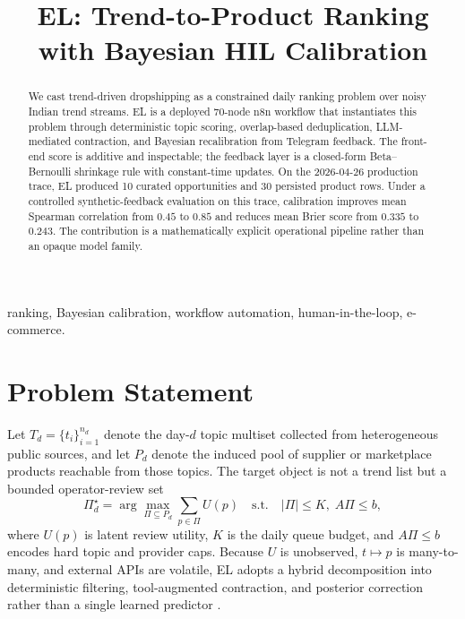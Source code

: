 \documentclass[conference,a4paper,10pt]{IEEEtran}
\title{EL: Trend-to-Product Ranking with Bayesian HIL Calibration}
\author{%
\IEEEauthorblockN{\small Divyesh Sharma, Sankalan Ghosh, Atharva Varshney, Rohan Kumar P, Jivendra Kumar Choudhary, Sourabha Srinivas}
\IEEEauthorblockA{R.V.\ College of Engineering, Bengaluru, India}
}
\begin{document}
\maketitle

\begin{abstract}
We cast trend-driven dropshipping as a constrained daily ranking problem over noisy Indian trend streams. EL is a deployed 70-node n8n workflow that instantiates this problem through deterministic topic scoring, overlap-based deduplication, LLM-mediated contraction, and Bayesian recalibration from Telegram feedback. The front-end score is additive and inspectable; the feedback layer is a closed-form Beta--Bernoulli shrinkage rule with constant-time updates. On the \mbox{2026-04-26} production trace, EL produced 10 curated opportunities and 30 persisted product rows. Under a controlled synthetic-feedback evaluation on this trace, calibration improves mean Spearman correlation from $0.45$ to $0.85$ and reduces mean Brier score from $0.335$ to $0.243$. The contribution is a mathematically explicit operational pipeline rather than an opaque model family.
\end{abstract}

\begin{IEEEkeywords}
ranking, Bayesian calibration, workflow automation, human-in-the-loop, e-commerce.
\end{IEEEkeywords}

\section{Problem Statement}
\label{sec:problem}

Let $T_d=\{t_i\}_{i=1}^{n_d}$ denote the day-$d$ topic multiset collected from heterogeneous public sources, and let $P_d$ denote the induced pool of supplier or marketplace products reachable from those topics. The target object is not a trend list but a bounded operator-review set
\begin{equation}
\label{eq:objective}
\Pi_d^\star=\arg\max_{\Pi\subseteq P_d}\sum_{p\in\Pi}U(p)
\quad \text{s.t.}\quad |\Pi|\le K,\; A\Pi\le b,
\end{equation}
where $U(p)$ is latent review utility, $K$ is the daily queue budget, and $A\Pi\le b$ encodes hard topic and provider caps. Because $U$ is unobserved, $t\mapsto p$ is many-to-many, and external APIs are volatile, EL adopts a hybrid decomposition into deterministic filtering, tool-augmented contraction, and posterior correction rather than a single learned predictor \cite{n8ndocs,yao2023react,wu2022humanloop}.
\end{document}
